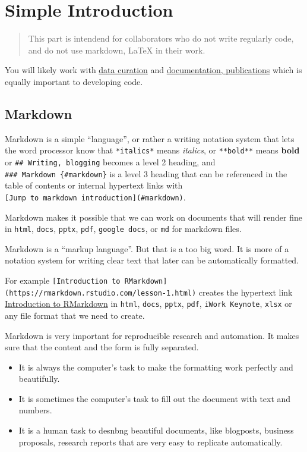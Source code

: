 \documentclass[
  fontsize=13pt,
  english,
  a4paper,
  openany, a4paper, oneside]{book}
\begin{document}
\hypertarget{simple-intro}{%
\section{Simple Introduction}\label{simple-intro}}

\begin{quote}
This part is intendend for collaborators who do not write regularly code, and do not use markdown, LaTeX in their work.
\end{quote}

You will likely work with \protect\hyperlink{data-curation}{data curation} and \protect\hyperlink{documentation}{documentation, publications} which is equally important to developing code.

\hypertarget{markdown}{%
\subsection{Markdown}\label{markdown}}

Markdown is a simple ``language'', or rather a writing notation system that lets the word processor know that \texttt{*italics*} means \emph{italics}, or \texttt{**bold**} means \textbf{bold} or \texttt{\#\#\ Writing,\ blogging} becomes a level 2 heading, and \texttt{\#\#\#\ Markdown\ \{\#markdown\}} is a level 3 heading that can be referenced in the table of contents or internal hypertext links with \texttt{{[}Jump\ to\ markdown\ introduction{]}(\#markdown)}.

Markdown makes it possible that we can work on documents that will render fine in \texttt{html}, \texttt{docs}, \texttt{pptx}, \texttt{pdf}, \texttt{google\ docs}, or \texttt{md} for markdown files.

Markdown is a ``markup language''. But that is a too big word. It is more of a notation system for writing clear text that later can be automatically formatted.

For example \texttt{{[}Introduction\ to\ RMarkdown{]}(https://rmarkdown.rstudio.com/lesson-1.html)} creates the hypertext link \href{https://rmarkdown.rstudio.com/lesson-1.html}{Introduction to RMarkdown} in \texttt{html}, \texttt{docs}, \texttt{pptx}, \texttt{pdf}, \texttt{iWork\ Keynote}, \texttt{xlsx} or any file format that we need to create.

Markdown is very important for reproducible research and automation. It makes sure that the content and the form is fully separated.

\begin{itemize}
\item
  It is always the computer's task to make the formatting work perfectly and beautifully.
\item
  It is sometimes the computer's task to fill out the document with text and numbers.
\item
  It is a human task to desnbng beautiful documents, like blogposts, business proposals, research reports that are very easy to replicate automatically.
\end{itemize}
\end{document}

